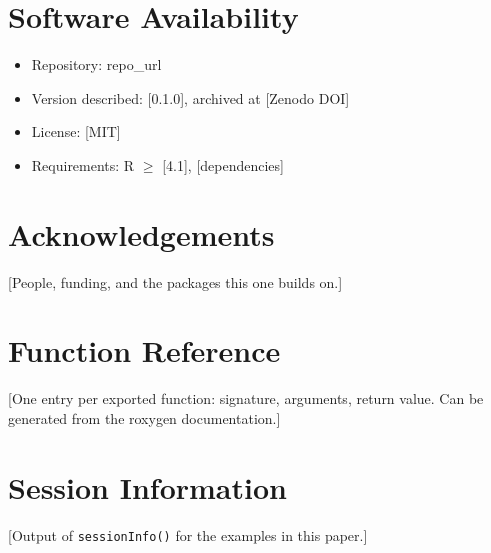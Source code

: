 \section*{Software Availability}
\begin{itemize}[nosep]
    \item Repository: {{repo_url}}
    \item Version described: [0.1.0], archived at [Zenodo DOI]
    \item License: [MIT]
    \item Requirements: R $\geq$ [4.1], [dependencies]
\end{itemize}

\section*{Acknowledgements}
[People, funding, and the packages this one builds on.]

\newpage
\printbibliography

\newpage
\appendix
\section{Function Reference}\label{app:reference}
[One entry per exported function: signature, arguments, return value. Can be generated from the roxygen documentation.]

\section{Session Information}\label{app:session}
[Output of \texttt{sessionInfo()} for the examples in this paper.]


